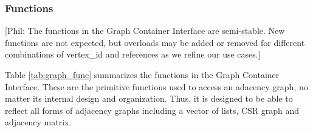 \documentclass[10pt,onecolumn]{article}
\newcommand{\comment}[2]{{\color{comment}[{\sc #1:} \textsf{#2}]}}
\newcommand{\phil}[1]{\comment{Phil}{#1}}
\begin{document}
\subsubsection{Functions}

\phil{The functions in the Graph Container Interface are semi-stable. New functions are not expected, but overloads may be added or removed for different combinations of 
vertex\_id and references as we refine our use cases.}

Table \ref{tab:graph_func} summarizes the functions in the Graph Container Interface. These are the primitive functions used to access an adacency graph, no matter its internal design and organization. Thus, it is designed to be able to reflect all forms of adjacency graphs including a vector of lists, CSR graph and adjacency matrix.
\end{document}
